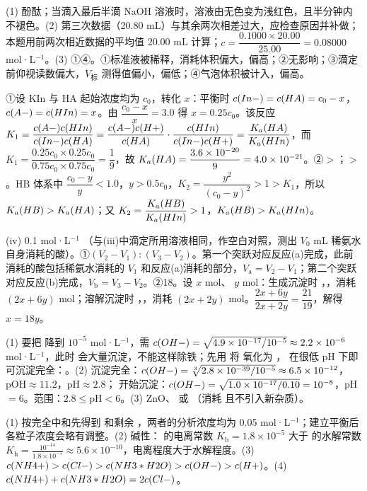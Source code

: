 \begin{jiexilist}
\item (1) 酚酞；当滴入最后半滴 NaOH 溶液时，溶液由无色变为浅红色，且半分钟内不褪色。(2) 第三次数据（20.80 mL）与其余两次相差过大，应检查原因并补做；本题用前两次相近数据的平均值 20.00 mL 计算；$c=\dfrac{0.1000\times20.00}{25.00}=0.08000$ mol·L$^{-1}$。(3) ①④。①标准液被稀释，消耗体积偏大，偏高；②无影响；③滴定前仰视读数偏大，$V_\text{标}$ 测得值偏小，偏低；④气泡体积被计入，偏高。
\item ①设 KIn 与 HA 起始浓度均为 $c_0$，转化 $x$：平衡时 $c(In-)=c(HA)=c_0-x$，$c(A-)=c(HIn)=x$。由 $\dfrac{c_0-x}{x}=3.0$ 得 $x=0.25c_0$。该反应 $K_1=\dfrac{c(A-)c(HIn)}{c(In-)c(HA)}=\dfrac{c(A-)c(H+)}{c(HA)}\cdot\dfrac{c(HIn)}{c(In-)c(H+)}=\dfrac{K_a(HA)}{K_a(HIn)}$，而 $K_1=\dfrac{0.25c_0\times0.25c_0}{0.75c_0\times0.75c_0}=\dfrac19$，故 $K_a(HA)=\dfrac{3.6\times10^{-20}}{9}=4.0\times10^{-21}$。②$>$；$>$。HB 体系中 $\dfrac{c_0-y}{y}<1.0$，$y>0.5c_0$，$K_2=\dfrac{y^2}{(c_0-y)^2}>1>K_1$，所以 $K_a(HB)>K_a(HA)$；又 $K_2=\dfrac{K_a(HB)}{K_a(HIn)}>1$，$K_a(HB)>K_a(HIn)$。
\item (iv) 0.1 mol·L$^{-1}$ （与(iii)中滴定所用溶液相同，作空白对照，测出 $V_0$ mL 稀氨水自身消耗的酸）。①$(V_2-V_1):(V_3-V_2)$。第一个突跃对应反应(a)完成，此前消耗的酸包括稀氨水消耗的 $V_1$ 和反应(a)消耗的部分，$V_\text{a}=V_2-V_1$；第二个突跃对应反应(b)完成，$V_\text{b}=V_3-V_2$。②18。设  $x$ mol、 $y$ mol：生成沉淀时 ，，消耗  $(2x+6y)$ mol；溶解沉淀时 ，，消耗 $(2x+2y)$ mol。$\dfrac{2x+6y}{2x+2y}=\dfrac{21}{19}$，解得 $x=18y$。
\item (1) 要把  降到 $10^{-5}$ mol·L$^{-1}$，需 $c(OH-)=\sqrt{4.9\times10^{-17}/10^{-5}}\approx2.2\times10^{-6}$ mol·L$^{-1}$，此时  会大量沉淀，不能这样除铁；先用  将  氧化为 ， 在很低 pH 下即可沉淀完全：。(2)  沉淀完全：$c(OH-)=\sqrt[3]{2.8\times10^{-39}/10^{-5}}\approx6.5\times10^{-12}$，pOH$\approx11.2$，pH$\approx2.8$； 开始沉淀：$c(OH-)=\sqrt{1.0\times10^{-17}/0.10}=10^{-8}$，pH$=6$。范围：$2.8\le$pH$<6$。(3) ZnO、 或 （消耗  且不引入新杂质）。
\item (1) 按完全中和先得到  和剩余 ，两者的分析浓度均为 0.05 mol·L$^{-1}$；建立平衡后各粒子浓度会略有调整。(2) 碱性： 的电离常数 $K_\text{b}=1.8\times10^{-5}$ 大于  的水解常数 $K_\text{h}=\frac{10^{-14}}{1.8\times10^{-5}}\approx5.6\times10^{-10}$，电离程度大于水解程度。(3) $c(NH4+)>c(Cl-)>c(NH3*H2O)>c(OH-)>c(H+)$。(4) $c(NH4+)+c(NH3*H2O)=2c(Cl-)$。

\end{jiexilist}
